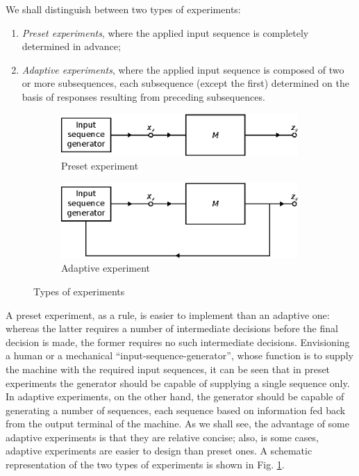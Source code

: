     We shall distinguish between two types of experiments:
\begin{enumerate}
    \item \emph{Preset experiments}, where the applied input sequence is completely determined in advance;
    \item \emph{Adaptive experiments}, where the applied input sequence is composed of two or more subsequences, each subsequence (except the first) determined on the basis of responses resulting from preceding subsequences.
\end{enumerate}

\begin{figure}
    \centering
    \begin{subfigure}{.85\textwidth}
        \centering
        \includegraphics[width=256pt, clip]{images/eps/presetExperiment}
        \caption{Preset experiment}
        \qquad
    \end{subfigure}
    \begin{subfigure}{.85\textwidth}
        \centering
        \includegraphics[width=256pt, clip]{images/eps/adaptiveExperiment}
        \caption{Adaptive experiment}
    \end{subfigure}
    \caption{Types of experiments}
    \label{fig:experiments}
\end{figure}

    A preset experiment, as a rule, is easier to implement than an adaptive one: whereas the latter requires a number of intermediate decisions before the final decision is made, the former requires no such intermediate decisions. Envisioning a human or a mechanical ``input-sequence-generator'', whose function is to supply the machine with the required input sequences, it can be seen that in preset experiments the generator should be capable of supplying a single sequence only. In adaptive experiments, on the other hand, the generator should be capable of generating a number of sequences, each sequence based on information fed back from the output terminal of the machine. As we shall see, the advantage of some adaptive experiments is that they are relative concise; also, is some cases, adaptive experiments are easier to design than preset ones. A schematic representation of the two types of experiments is shown in Fig. \ref{fig:experiments}.

